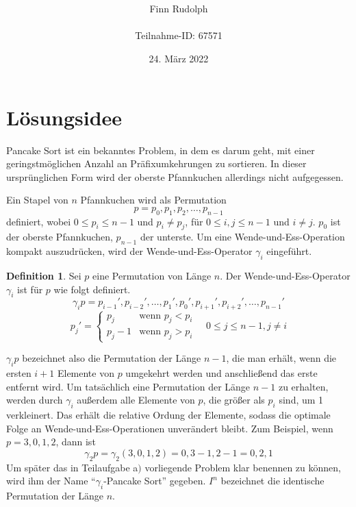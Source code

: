 \documentclass[a4paper, 10pt, ngerman]{article}
\title{\LARGE \textbf{\Aufgabe}}
\author{\large Finn Rudolph \\ \\ \large Teilnahme-ID: 67571}
\date{\large 24. März 2022}
\begin{document}
\begin{titlepage}
    \maketitle
    \tableofcontents
    \thispagestyle{empty}
\end{titlepage}

\newtheorem{theorem}{Satz}
\newtheorem{lemma}{Lemma}
\theoremstyle{definition}
\newtheorem{definition}{Definition}

\section{Lösungsidee}

Pancake Sort ist ein bekanntes Problem, in dem es darum geht, mit einer geringstmöglichen Anzahl an Präfixumkehrungen zu sortieren. In dieser ursprünglichen Form wird der oberste Pfannkuchen allerdings nicht aufgegessen.

Ein Stapel von $n$ Pfannkuchen wird als Permutation
$$
    p = p_0, p_1, p_2, \dots, p_{n - 1}
$$
definiert, wobei $0 \le p_i \le n-1$ und $p_i \ne p_j$, für $0 \le i, j \le n-1$ und $i \ne j$. $p_0$ ist der oberste Pfannkuchen, $p_{n - 1}$ der unterste. Um eine Wende-und-Ess-Operation kompakt auszudrücken, wird der Wende-und-Ess-Operator $\gamma_i$ eingeführt.

\begin{definition}
    Sei $p$ eine Permutation von Länge $n$. Der Wende-und-Ess-Operator $\gamma_i$ ist für $p$ wie folgt definiert.
    $$
        \gamma_i p = p_{i-1}', p_{i-2}', \dots, p_1', p_0', p_{i+1}', p_{i+2}', \dots, p_{n-1}'
    $$
    $$
        p_j' = \begin{cases}
            p_j     & \text{wenn } p_j < p_i \\
            p_j - 1 & \text{wenn } p_j > p_i
        \end{cases}
        \quad 0 \le j \le n - 1, j \ne i
    $$
\end{definition}

$\gamma_i p$ bezeichnet also die Permutation der Länge $n - 1$, die man erhält, wenn die ersten $i+1$ Elemente von $p$ umgekehrt werden und anschließend das erste entfernt wird. Um tatsächlich eine Permutation der Länge $n - 1$ zu erhalten, werden durch $\gamma_i$ außerdem alle Elemente von $p$, die größer als $p_i$ sind, um 1 verkleinert. Das erhält die relative Ordung der Elemente, sodass die optimale Folge an Wende-und-Ess-Operationen unverändert bleibt. Zum Beispiel, wenn $p = 3, 0, 1, 2$, dann ist
$$
    \gamma_2 p = \gamma_2 (3, 0, 1, 2) = 0, 3 - 1, 2 - 1 = 0, 2, 1
$$
Um später das in Teilaufgabe a$)$ vorliegende Problem klar benennen zu können, wird ihm der Name ``$\gamma_i$-Pancake Sort'' gegeben. $I^n$ bezeichnet die identische Permutation der Länge $n$.
\end{document}
